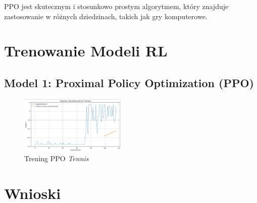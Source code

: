 \documentclass[conference]{IEEEtran}
\begin{document}
PPO jest skutecznym i stosunkowo prostym algorytmem, który znajduje zastosowanie w różnych dziedzinach, takich jak gry komputerowe.





\section{Trenowanie Modeli RL}

\subsection{Model 1: Proximal Policy Optimization (PPO)}
\begin{figure}[htbp] \centering \includegraphics[width=0.45\textwidth]{image.png} \caption{Trening PPO \textit{Tennis}} \label{fig:tennis} \end{figure}





\section{Wnioski}
\end{document}
